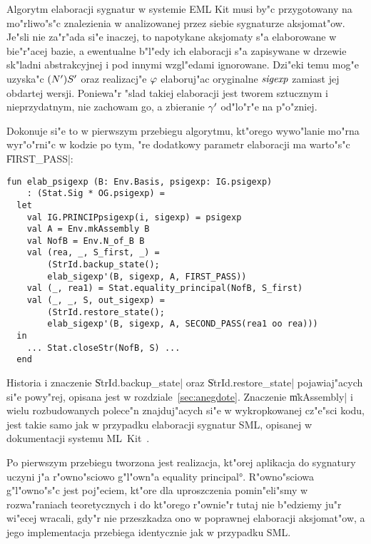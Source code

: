 Algorytm elaboracji sygnatur w systemie EML Kit
musi by"c przygotowany na mo"rliwo"s"c znalezienia 
w analizowanej przez siebie sygnaturze aksjomat"ow.
Je"sli nie za"r"ada si"e inaczej, 
to napotykane aksjomaty s"a elaborowane w bie"r"acej bazie,
a ewentualne b"l"edy ich elaboracji s"a zapisywane
w drzewie sk"ladni abstrakcyjnej i pod innymi wzgl"edami ignorowane.
Dzi"eki temu mog"e uzyska"c $(N')S'$ oraz realizacj"e $\varphi$
elaboruj"ac oryginalne ${\it sigexp}$ zamiast jej obdartej wersji.
Poniewa"r "slad takiej elaboracji jest tworem sztucznym i nieprzydatnym,
nie zachowam go, a zbieranie $\gamma'$ od"lo"r"e na p"o"zniej.

Dokonuje si"e to w pierwszym przebiegu algorytmu,
kt"orego wywo"lanie mo"rna wyr"o"rni"c w kodzie
po tym, "re dodatkowy parametr elaboracji ma warto"s"c \|FIRST_PASS|:
{\small
\begin{verbatim}
fun elab_psigexp (B: Env.Basis, psigexp: IG.psigexp)
    : (Stat.Sig * OG.psigexp) =
  let
    val IG.PRINCIPpsigexp(i, sigexp) = psigexp
    val A = Env.mkAssembly B
    val NofB = Env.N_of_B B
    val (rea, _, S_first, _) = 
        (StrId.backup_state();
        elab_sigexp'(B, sigexp, A, FIRST_PASS))
    val (_, rea1) = Stat.equality_principal(NofB, S_first)
    val (_, _, S, out_sigexp) = 
        (StrId.restore_state();
        elab_sigexp'(B, sigexp, A, SECOND_PASS(rea1 oo rea)))
  in 
    ... Stat.closeStr(NofB, S) ... 
  end
\end{verbatim}
} 
Historia i znaczenie \|StrId.backup_state| oraz \|StrId.restore_state|
pojawiaj"acych si"e powy"rej, opisana jest w rozdziale~\ref{sec:anegdote}.
Znaczenie \|mkAssembly| i wielu rozbudowanych polece"n znajduj"acych
si"e w wykropkowanej cz"e"sci kodu, jest takie samo jak w przypadku
elaboracji sygnatur SML, opisanej w dokumentacji systemu ML~Kit~\cite{BRTT93}.

Po pierwszym przebiegu tworzona jest realizacja, kt"orej aplikacja do
sygnatury uczyni j"a r"owno"sciowo g"l"own"a \ang{equality principal}.
R"ow\-no\-"scio\-wa g"l"owno"s"c jest poj"eciem, 
kt"ore dla uproszczenia pomin"eli"smy w roz\-wa\-"ra\-niach teoretycznych 
i do kt"orego r"ownie"r tutaj nie b"edziemy ju"r wi"ecej wracali,
gdy"r nie przeszkadza ono w poprawnej elaboracji aksjomat"ow,
a jego implementacja przebiega identycznie jak w przypadku SML.


